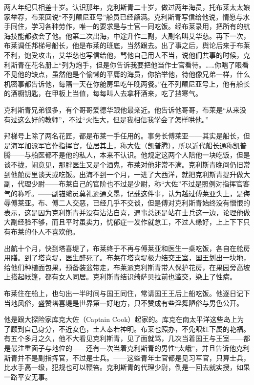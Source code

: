 \par 两人年纪只相差十岁。认识那年，克利斯青二十岁，做过两年海员，托布莱太太娘家举荐，布莱回说“不列颠尼亚号”船员已经额满。克利斯青写信给他说，情愿与水手同住，学习各种劳作，唯一的要求是与士官一同吃饭。经布莱录用，把所有的航海技能都教会了他。他第二次出海，中途升作二副，大副名叫艾华慈。再下一次，布莱调任邦梯号船长，他是布莱的班底，当然跟去。出了事之后，舆论后来于布莱不利，饱受攻击，艾华慈也写信给他，骂他自己用人不当，说他们共事的时候，克利斯青在花名册上“列为炮手，但是你告诉我要把他当作士官看待。……你瞎了眼看不见他的缺点，虽然他是个偷懒的平庸的海员，你抬举他，待他像兄弟一样，什么机密事都告诉他，每隔一天在你舱房里吃午晚两餐。”在不列颠尼亚号上，他有船长的酒橱钥匙，在甲板上当值，每每叫人去拿杯酒来，吃了挡寒气。
\par 克利斯青兄弟很多，有个哥哥爱德华跟他最亲近。他告诉他哥哥，布莱是“从来没有过这么好的教师”，不过“火性大，但是我相信我学会了怎样哄他。”
\par 邦梯号上除了两名花匠，都是布莱一手任用的。事务长傅莱亚——其实是船长，但是海军加派军官作指挥官，位居其上，称大佐（凯普腾），所以近代船长通称凯普腾——与船医都不是他的私人，本来不认识。他规定这两个人陪他一块吃饭，但是谈不拢，闹意见，那胖医生又是个酒鬼，布莱对他非常不满。克利斯青晚间仍旧常到他舱房里谈天或吃饭。出海不到一个月，一进了大西洋，就把克利斯青提升做大副，代理少尉——布莱自己的官阶也不过是少尉，称“大佐”不过是照例对指挥官客气的称呼。——副锚缆员莫礼逊通文墨，记载这件事，认为越过傅莱亚头上，是侮辱傅莱亚。布、傅二人交恶，已经几乎不交谈，但是傅对克利斯青始终没有憎恨的表示，这是因为克利斯青并没有沾沾自喜，遇事总还是站在士兵这一边，论理他做大副经验不够，而且平时虽卖力，忧郁症一发作就怠工，不过人缘好，上上下下只有布莱的仆人不喜欢他。
\par 出航十个月，快到塔喜堤了，布莱终于不再与傅莱亚和医生一桌吃饭，各自在舱房用膳。到了塔喜堤，医生醉死了。布莱在塔喜堤极力结交王室，国王划出一块地，给他们种植面包果，预备装盆带走，布莱派克利斯青带人保护花房，在果园旁高坡上搭起帐篷，都有女人同居。克利斯青结识绮萨贝拉前也滥交，染上了性病。
\par 布莱住在船上，也匀出一半时间与国王同住，常请国王王后上船吃饭。他逐日记下当地风俗，盛赞塔喜堤是世界第一好地方，只不赞成有些淫舞陋俗与男色公开。
\par 他是跟大探险家库克大佐（Captain Cook）起家的。库克在南太平洋这些岛上为了顾到自己身分，不近女色，土人奉若神明。布莱也照办，不免眼红下属的艳福。有五个多月之久，他不大看见克利斯青，见了面就骂，几次当着国王与王室——都是最注重面子与地位的——还有一次当着克利斯青的男性“太峨”，并且告诉他克利斯青并不是副指挥官，不过是士兵。——这些青年士官都是见习军官，只算士兵，比水手高一级，犯规也可以鞭笞。克利斯青的代理少尉，倒是一回去就实授，如果一路平安无事。
